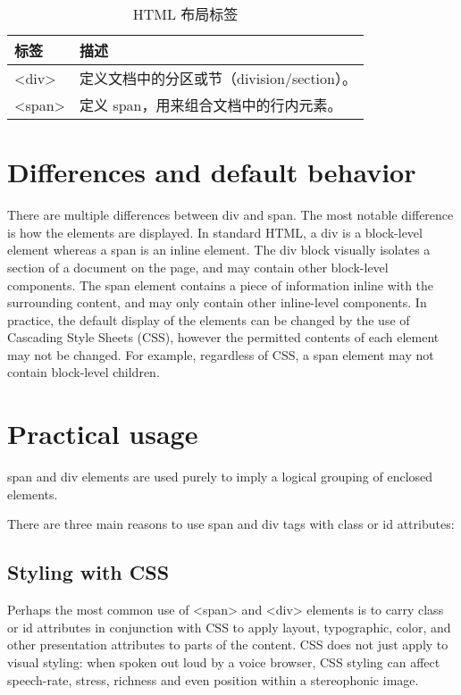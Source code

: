 \begin{table}
\centering
\caption{HTML 布局标签}
\begin{tabular}{|l|l|}
\hline
标签		&描述\\
\hline
<div>	&定义文档中的分区或节（division/section）。\\
\hline
<span>	&定义 span，用来组合文档中的行内元素。\\
\hline
\end{tabular}
\end{table}


\section{Differences and default behavior}


There are multiple differences between div and span. The most notable difference is how the elements are displayed. In standard HTML, a div is a block-level element whereas a span is an inline element. The div block visually isolates a section of a document on the page, and may contain other block-level components. The span element contains a piece of information inline with the surrounding content, and may only contain other inline-level components. In practice, the default display of the elements can be changed by the use of Cascading Style Sheets (CSS), however the permitted contents of each element may not be changed. For example, regardless of CSS, a span element may not contain block-level children.



\section{ Practical usage}

span and div elements are used purely to imply a logical grouping of enclosed elements.

There are three main reasons to use span and div tags with class or id attributes:





\subsection{Styling with CSS}

Perhaps the most common use of <span> and <div> elements is to carry class or id attributes in conjunction with CSS to apply layout, typographic, color, and other presentation attributes to parts of the content. CSS does not just apply to visual styling: when spoken out loud by a voice browser, CSS styling can affect speech-rate, stress, richness and even position within a stereophonic image.

